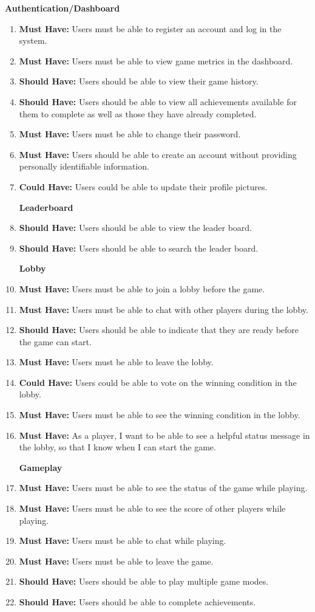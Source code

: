 \documentclass{l4proj}
\begin{document}
\textbf{Authentication/Dashboard}
\begin{enumerate}
    \item \textbf{Must Have:} Users must be able to register an account and log in the system.
    \item \textbf{Must Have:} Users must be able to view game metrics in the dashboard.
    \item \textbf{Should Have:} Users should be able to view their game history.
    \item \textbf{Should Have:} Users should be able to view all achievements available for them to complete as well as those they have already completed.
    \item \textbf{Must Have:} Users must be able to change their password.
    \item \textbf{Must Have:} Users should be able to create an account without providing personally identifiable information.
    \item \textbf{Could Have:} Users could be able to update their profile pictures.

\textbf{Leaderboard}
    \item \textbf{Should Have:} Users should be able to view the leader board.
    \item \textbf{Should Have:} Users should be able to search the leader board.


\textbf{Lobby}
    \item \textbf{Must Have:} Users must be able to join a lobby before the game.
    \item \textbf{Must Have:} Users must be able to chat with other players during the lobby.
    \item \textbf{Should Have:} Users should be able to indicate that they are ready before the game can start.
    \item \textbf{Must Have:} Users must be able to leave the lobby.
    \item \textbf{Could Have:} Users could be able to vote on the winning condition in the lobby.
    \item \textbf{Must Have:} Users must be able to see the winning condition in the lobby.
    \item \textbf{Must Have:} As a player, I want to be able to see a helpful status message in the lobby, so that I know when I can start the game.


\textbf{Gameplay}
    \item \textbf{Must Have:} Users must be able to see the status of the game while playing.
    \item \textbf{Must Have:} Users must be able to see the score of other players while playing.
    \item \textbf{Must Have:} Users must be able to chat while playing.
    \item \textbf{Must Have:} Users must be able to leave the game.
    \item \textbf{Should Have:} Users should be able to play multiple game modes.
    \item \textbf{Should Have:} Users should be able to complete achievements.


\end{enumerate}
\end{document}

